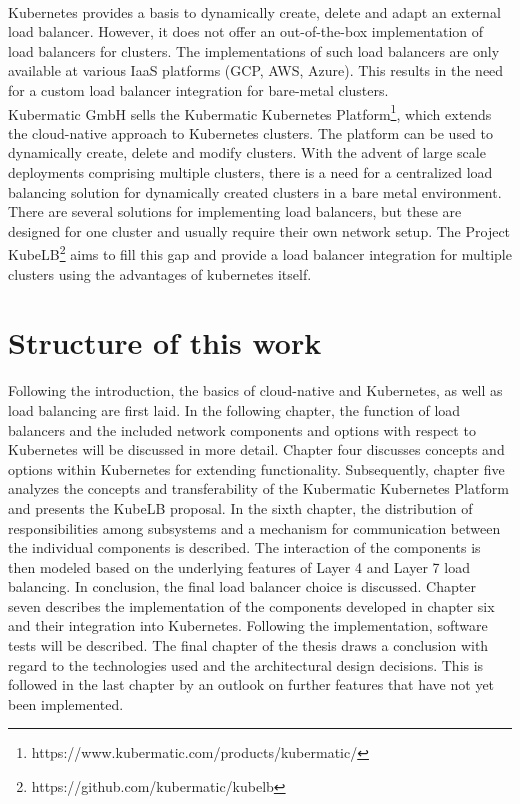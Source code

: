 \\
Kubernetes provides a basis to dynamically create, delete and adapt an external load balancer.
However, it does not offer an out-of-the-box implementation of load balancers for clusters.
The implementations of such load balancers are only available at various IaaS platforms (GCP, AWS, Azure).
This results in the need for a custom load balancer integration for bare-metal clusters.
\\
Kubermatic GmbH sells the Kubermatic Kubernetes Platform\footnote{https://www.kubermatic.com/products/kubermatic/}, which extends the cloud-native approach to Kubernetes clusters.
The platform can be used to dynamically create, delete and modify clusters.
With the advent of large scale deployments comprising multiple clusters, there is a need for a centralized load balancing solution for dynamically created clusters in a bare metal environment.
There are several solutions for implementing load balancers, but these are designed for one cluster and usually require their own network setup.
The Project KubeLB\footnote{https://github.com/kubermatic/kubelb} aims to fill this gap and provide a load balancer integration for multiple clusters using the advantages of kubernetes itself.

\section{Structure of this work}
Following the introduction, the basics of cloud-native and Kubernetes, as well as load balancing are first laid.
In the following chapter, the function of load balancers and the included network components and options with respect to Kubernetes will be discussed in more detail.
Chapter four discusses concepts and options within Kubernetes for extending functionality.
Subsequently, chapter five analyzes the concepts and transferability of the Kubermatic Kubernetes Platform and presents the KubeLB proposal.
In the sixth chapter, the distribution of responsibilities among subsystems and a mechanism for communication between the individual components is described.
The interaction of the components is then modeled based on the underlying features of Layer 4 and Layer 7 load balancing.
In conclusion, the final load balancer choice is discussed.
Chapter seven describes the implementation of the components developed in chapter six and their integration into Kubernetes.
Following the implementation, software tests will be described.
The final chapter of the thesis draws a conclusion with regard to the technologies used and the architectural design decisions.
This is followed in the last chapter by an outlook on further features that have not yet been implemented.
